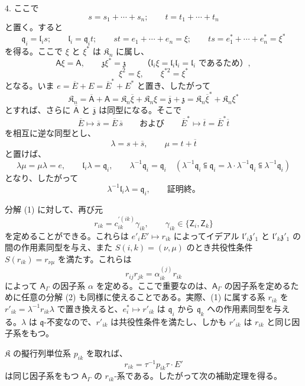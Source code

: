 4. ここで
\[
s=s_1+\cdots+s_n;\qquad t=t_1+\cdots+t_n
\]
と置く。すると
\[
\mathfrak q_i=\mathfrak l_is;\qquad
\mathfrak l_i=\mathfrak q_it;\qquad
st=e_1+\cdots+e_n=\xi;\qquad
ts=e_1^*+\cdots+e_n^*=\xi^*
\]
を得る。ここで \(\xi\) と \(\xi^*\) は \(\mathfrak K_n\) に属し、
\[
\mathsf{A}\xi=\mathsf{A},\qquad \mathfrak z\xi^*=\mathfrak z\quad
\quad\text{（}\mathfrak l_i\xi=\mathfrak l_i\mathfrak l_i=\mathfrak l_i\text{ であるため）},
\]
\[
\xi^2=\xi,\qquad \xi^{*2}=\xi^*
\]
となる。いま \(e=\overline E+E=\overline E^*+E^*\) と置き、したがって
\[
\mathfrak K_n=\overline{\mathsf A}+\mathsf{A}
=\mathfrak K_n\overline\xi+\mathfrak K_n\xi
=\overline{\mathfrak z}+\mathfrak z
=\mathfrak K_n\overline\xi^*+\mathfrak K_n\xi^*
\]
とすれば、さらに \(\overline{\mathsf A}\) と \(\overline{\mathfrak z}\) は同型になる。そこで
\[
\overline E\mapsto\overline s=\overline E\,\overline s
\qquad\text{および}\qquad
\overline E^*\mapsto\overline t=\overline E^*\overline t
\]
を相互に逆な同型とし、
\[
\lambda=s+\overline s,\qquad \mu=t+\overline t
\]
と置けば、
\[
\lambda\mu=\mu\lambda=e,\qquad
\mathfrak l_i\lambda=\mathfrak q_i,\qquad
\lambda^{-1}\mathfrak q_i=\mathfrak q_i
\quad
(\lambda^{-1}\mathfrak q_i\subseteqq\mathfrak q_i
=\lambda\cdot\lambda^{-1}\mathfrak q_i\subseteqq\lambda^{-1}\mathfrak q_i)
\]
となり、したがって
\[
\lambda^{-1}\mathfrak l_i\lambda=\mathfrak q_i,\qquad \text{証明終。}
\]

分解 (1) に対して、再び元
\[
r_{ik}=c_{ik}^{\prime(ik)}\gamma_{ik},\qquad \gamma_{ik}\in\{\mathsf{Z}_i,\mathsf{Z}_k\}
\]
を定めることができる。これらは \(e'_iE'\mapsto r_{ik}\) によってイデアル \(\mathfrak l'_i\mathfrak z'_1\) と \(\mathfrak l'_k\mathfrak z'_1\) の間の作用素同型を与え、また \(S(i,k)=(\nu,\mu)\) のとき共役性条件 \(S(r_{ik})=r_{\nu\mu}\) を満たす。これらは
\[
r_{ij}r_{jk}=\alpha_{ik}^{(j)}r_{ik}
\]
によって \(\mathsf{A}_\Gamma\) の因子系 \(\alpha\) を定める。ここで重要なのは、\(\mathsf{A}_\Gamma\) の因子系を定めるために任意の分解 (2) も同様に使えることである。実際、(1) に属する系 \(r_{ik}\) を \(r'_{ik}=\lambda^{-1}r_{ik}\lambda\) で置き換えると、\(e_i^*\mapsto r'_{ik}\) は \(\mathfrak q_i\) から \(\mathfrak q_k\) への作用素同型を与える。\(\lambda\) は \(\mathfrak q\)-不変なので、\(r'_{ik}\) は共役性条件を満たし、しかも \(r'_{ik}\) は \(r_{ik}\) と同じ因子系をもつ。

\(\mathfrak K\) の擬行列単位系 \(p_{ik}\) を取れば、
\[
r_{ik}=\tau^{-1}p_{ik}\tau\cdot E'
\]
は同じ因子系をもつ \(\mathsf{A}_\Gamma\) の \(r_{ik}\)-系である。したがって次の補助定理を得る。


